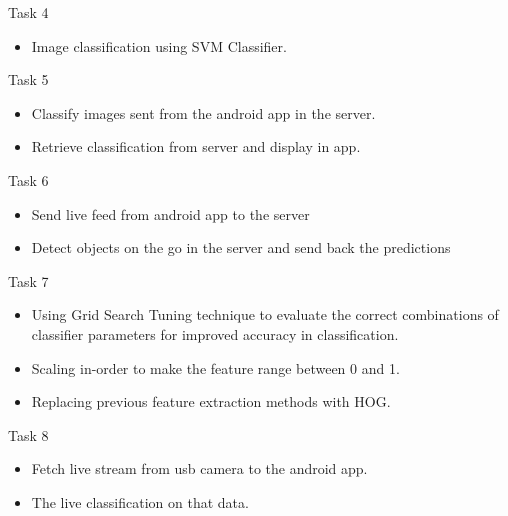 \documentclass{beamer}
\begin{document}
\begin{frame}{Task 4}
\begin{itemize}
  \item Image classification using SVM Classifier. 
\end{itemize}
\end{frame}

\begin{frame}{Task 5}
\begin{itemize}
  \item Classify images sent from the android app in the server.
  \item Retrieve classification from server and display in app.
\end{itemize}
\end{frame}

\begin{frame}{Task 6}
\begin{itemize}
	\item Send live feed from android app to the server
	\item Detect objects on the go in the server and send back the predictions
\end{itemize}
\end{frame}


\begin{frame}{Task 7}
\begin{itemize}
  \item Using Grid Search Tuning technique to evaluate the correct combinations of classifier parameters for improved accuracy in classification.
  \item Scaling in-order to make the feature range between 0 and 1.
  \item Replacing previous feature extraction methods with HOG.
\end{itemize}
\end{frame}


\begin{frame}{Task 8}
\begin{itemize}
	\item Fetch live stream from usb camera to the android app.
	\item The live classification on that data.
\end{itemize}
\end{frame}
\end{document}
